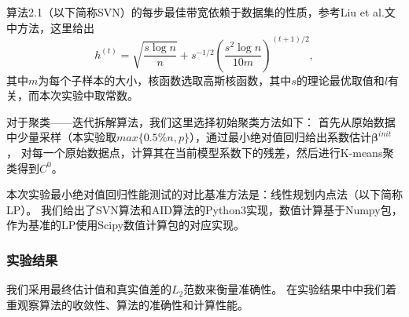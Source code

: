 算法2.1（以下简称SVN）的每步最佳带宽依赖于数据集的性质，参考Liu et al.文中方法\cite{svn}，这里给出
$$
    h^{(t)} = \sqrt{\frac{s\log n}{n}} + s^{-1/2} (\frac{s^2\log n}{10m})^{(t+1)/2},
$$
其中$m$为每个子样本的大小，核函数选取高斯核函数，其中$s$的理论最优取值和$l$有关，而本次实验中取常数。

对于聚类——迭代拆解算法，我们这里选择初始聚类方法如下：
首先从原始数据中少量采样（本实验取$max\{0.5\%n, p\}$），通过最小绝对值回归给出系数估计$\bm{\beta}^{init}$，
对每一个原始数据点，计算其在当前模型系数下的残差，然后进行K-means聚类得到$C^0$。

本次实验最小绝对值回归性能测试的对比基准方法是：线性规划内点法（以下简称LP）。
我们给出了SVN算法和AID算法的Python3实现，数值计算基于Numpy包，
作为基准的LP使用Scipy数值计算包的对应实现。

\subsubsection{实验结果}
我们采用最终估计值和真实值差的$L_2$范数来衡量准确性。
在实验结果中中我们着重观察算法的收敛性、算法的准确性和计算性能。

